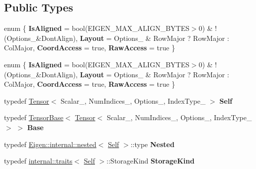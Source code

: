 \subsection*{Public Types}
\begin{DoxyCompactItemize}
\item 
\mbox{\label{class_eigen_1_1_tensor_afae54a3ef6e18cc79f7ce04831d1bda1}} 
enum \{ {\bfseries Is\+Aligned} = bool(E\+I\+G\+E\+N\+\_\+\+M\+A\+X\+\_\+\+A\+L\+I\+G\+N\+\_\+\+B\+Y\+T\+ES$>$0) \& !(Options\+\_\+\&Dont\+Align), 
{\bfseries Layout} = Options\+\_\+ \& Row\+Major ? Row\+Major \+: Col\+Major, 
{\bfseries Coord\+Access} = true, 
{\bfseries Raw\+Access} = true
 \}
\item 
\mbox{\label{class_eigen_1_1_tensor_a156cb0b9f07723c83984b8ed8b01c652}} 
enum \{ {\bfseries Is\+Aligned} = bool(E\+I\+G\+E\+N\+\_\+\+M\+A\+X\+\_\+\+A\+L\+I\+G\+N\+\_\+\+B\+Y\+T\+ES$>$0) \& !(Options\+\_\+\&Dont\+Align), 
{\bfseries Layout} = Options\+\_\+ \& Row\+Major ? Row\+Major \+: Col\+Major, 
{\bfseries Coord\+Access} = true, 
{\bfseries Raw\+Access} = true
 \}
\item 
\mbox{\label{class_eigen_1_1_tensor_ab33b8fd823b0258d167625f35db35eb4}} 
typedef \hyperlink{class_eigen_1_1_tensor}{Tensor}$<$ Scalar\+\_\+, Num\+Indices\+\_\+, Options\+\_\+, Index\+Type\+\_\+ $>$ {\bfseries Self}
\item 
\mbox{\label{class_eigen_1_1_tensor_aadebf932105d728ed8c3961f87799d38}} 
typedef \hyperlink{class_eigen_1_1_tensor_base}{Tensor\+Base}$<$ \hyperlink{class_eigen_1_1_tensor}{Tensor}$<$ Scalar\+\_\+, Num\+Indices\+\_\+, Options\+\_\+, Index\+Type\+\_\+ $>$ $>$ {\bfseries Base}
\item 
\mbox{\label{class_eigen_1_1_tensor_ad49db39b1b2028c0af0bf15d930b6ad9}} 
typedef \hyperlink{struct_eigen_1_1internal_1_1nested}{Eigen\+::internal\+::nested}$<$ \hyperlink{class_eigen_1_1_tensor}{Self} $>$\+::type {\bfseries Nested}
\item 
\mbox{\label{class_eigen_1_1_tensor_af2c9f01cb7423c11e0771d84d099d127}} 
typedef \hyperlink{struct_eigen_1_1internal_1_1traits}{internal\+::traits}$<$ \hyperlink{class_eigen_1_1_tensor}{Self} $>$\+::Storage\+Kind {\bfseries Storage\+Kind}

\end{DoxyCompactItemize}

